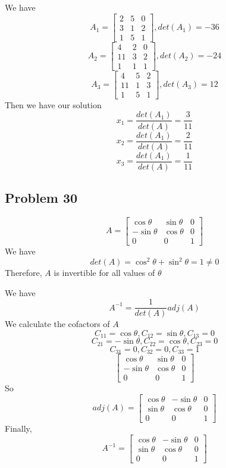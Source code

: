 \documentclass[a4paper,12pt]{report}
\begin{document}
We have
\[
A_1=\begin{bmatrix}
    2       & 5 & 0 \\
    3       & 1 & 2 \\
    1       & 5 & 1
\end{bmatrix}, det(A_1) =-36\]
\[
A_2=\begin{bmatrix}
    4       & 2 & 0 \\
    11       & 3 & 2 \\
    1       & 1 & 1
\end{bmatrix}, det(A_2) =-24\]
\[
A_3=\begin{bmatrix}
    4       & 5 & 2 \\
    11       & 1 & 3 \\
    1       & 5 & 1
\end{bmatrix}, det(A_3) =12\]
Then we have our solution
\[x_1=\frac{det(A_1)}{det(A)}=\frac{3}{11}\]
\[x_2=\frac{det(A_1)}{det(A)}=\frac{2}{11}\]
\[x_3=\frac{det(A_1)}{det(A)}=\frac{1}{11}\]

\subsection*{Problem 30}
\[
A=\begin{bmatrix}
    \cos\theta       & \sin\theta & 0 \\
    -\sin\theta       & \cos\theta & 0 \\
    0       & 0 & 1
\end{bmatrix}\]
We have
\[
det(A)=\cos^2\theta+\sin^2\theta=1\neq0\]
Therefore, \(A\) is invertible for all values of \(\theta\)

We have 
\[A^{-1}=\frac{1}{det(A)}adj(A)\]
We calculate the cofactors of \(A\)
\[C_{11}=\cos\theta,C_{12}=\sin\theta,C_{13}=0\]
\[C_{21}=-\sin\theta,C_{22}=\cos\theta,C_{23}=0\]
\[C_{31}=0,C_{32}=0,C_{33}=1\]
\[\begin{bmatrix}
    \cos\theta       & \sin\theta & 0\\
    -\sin\theta       & \cos\theta & 0 \\
    0       & 0 & 1
\end{bmatrix}
\]
So
\[adj(A)=
\begin{bmatrix}
    \cos\theta       & -\sin\theta & 0 \\
    \sin\theta       & \cos\theta & 0 \\
    0       & 0 & 1
\end{bmatrix}\]
Finally,
\[A^{-1}=\begin{bmatrix}
    \cos\theta       & -\sin\theta & 0 \\
    \sin\theta       & \cos\theta & 0 \\
    0       & 0 & 1
\end{bmatrix}\]
\end{document}
